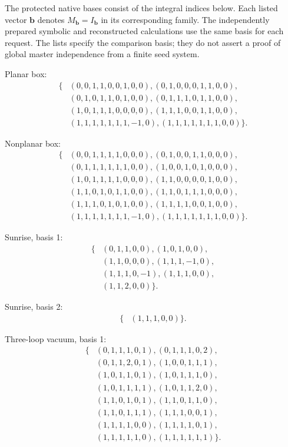 \documentclass[11pt,a4paper]{article}
\begin{document}
The protected native bases consist of the integral indices below. Each listed vector $\boldsymbol b$ denotes $M_{\boldsymbol b}=I_{\boldsymbol b}$ in its corresponding family. The independently prepared symbolic and reconstructed calculations use the same basis for each request. The lists specify the comparison basis; they do not assert a proof of global master independence from a finite seed system.

Planar box:\[\begin{aligned}\{&(0,0,1,1,0,0,1,0,0),(0,1,0,0,0,1,1,0,0),\\&(0,1,0,1,1,0,1,0,0),(0,1,1,1,0,1,1,0,0),\\&(1,0,1,1,1,0,0,0,0),(1,1,1,0,0,1,1,0,0),\\&(1,1,1,1,1,1,1,-1,0),(1,1,1,1,1,1,1,0,0)\}.\end{aligned}\]

Nonplanar box:\[\begin{aligned}\{&(0,0,1,1,1,1,0,0,0),(0,1,0,0,1,1,0,0,0),\\&(0,1,1,1,1,1,1,0,0),(1,0,0,1,0,1,0,0,0),\\&(1,0,1,1,1,1,0,0,0),(1,1,0,0,0,0,1,0,0),\\&(1,1,0,1,0,1,1,0,0),(1,1,0,1,1,1,0,0,0),\\&(1,1,1,0,1,0,1,0,0),(1,1,1,1,0,0,1,0,0),\\&(1,1,1,1,1,1,1,-1,0),(1,1,1,1,1,1,1,0,0)\}.\end{aligned}\]

Sunrise, basis 1:\[\begin{aligned}\{&(0,1,1,0,0),(1,0,1,0,0),\\&(1,1,0,0,0),(1,1,1,-1,0),\\&(1,1,1,0,-1),(1,1,1,0,0),\\&(1,1,2,0,0)\}.\end{aligned}\]

Sunrise, basis 2:\[\begin{aligned}\{&(1,1,1,0,0)\}.\end{aligned}\]

Three-loop vacuum, basis 1:\[\begin{aligned}\{&(0,1,1,1,0,1),(0,1,1,1,0,2),\\&(0,1,1,2,0,1),(1,0,0,1,1,1),\\&(1,0,1,1,0,1),(1,0,1,1,1,0),\\&(1,0,1,1,1,1),(1,0,1,1,2,0),\\&(1,1,0,1,0,1),(1,1,0,1,1,0),\\&(1,1,0,1,1,1),(1,1,1,0,0,1),\\&(1,1,1,1,0,0),(1,1,1,1,0,1),\\&(1,1,1,1,1,0),(1,1,1,1,1,1)\}.\end{aligned}\]
\end{document}
